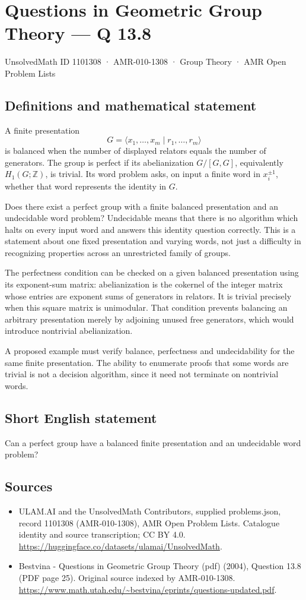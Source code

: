 \documentclass[11pt,a4paper]{article}
\begin{document}
\section*{Questions in Geometric Group Theory — Q 13.8}\label{1101308}
{\small UnsolvedMath ID 1101308 · AMR-010-1308 · Group Theory · AMR Open Problem Lists}
\subsection{Definitions and mathematical statement}
A finite presentation
\[
 G=\langle x_1,\ldots,x_m\mid r_1,\ldots,r_m\rangle
\]
is balanced when the number of displayed relators equals the number of generators. The group is perfect if its abelianization $G/[G,G]$, equivalently $H_1(G;\mathbb Z)$, is trivial. Its word problem asks, on input a finite word in $x_i^{\pm1}$, whether that word represents the identity in $G$.

Does there exist a perfect group with a finite balanced presentation and an undecidable word problem? Undecidable means that there is no algorithm which halts on every input word and answers this identity question correctly. This is a statement about one fixed presentation and varying words, not just a difficulty in recognizing properties across an unrestricted family of groups.

The perfectness condition can be checked on a given balanced presentation using its exponent-sum matrix: abelianization is the cokernel of the integer matrix whose entries are exponent sums of generators in relators. It is trivial precisely when this square matrix is unimodular. That condition prevents balancing an arbitrary presentation merely by adjoining unused free generators, which would introduce nontrivial abelianization.

A proposed example must verify balance, perfectness and undecidability for the same finite presentation. The ability to enumerate proofs that some words are trivial is not a decision algorithm, since it need not terminate on nontrivial words.
\subsection{Short English statement}
Can a perfect group have a balanced finite presentation and an undecidable word problem?
\subsection{Sources}
\begin{itemize}
\item[S1] ULAM.AI and the UnsolvedMath Contributors, supplied problems.json, record 1101308 (AMR-010-1308), AMR Open Problem Lists. Catalogue identity and source transcription; CC BY 4.0.
\url{https://huggingface.co/datasets/ulamai/UnsolvedMath}.
\item[S2] Bestvina - Questions in Geometric Group Theory (pdf) (2004), Question 13.8 (PDF page 25). Original source indexed by AMR-010-1308.
\url{https://www.math.utah.edu/~bestvina/eprints/questions-updated.pdf}.
\end{itemize}
\end{document}
